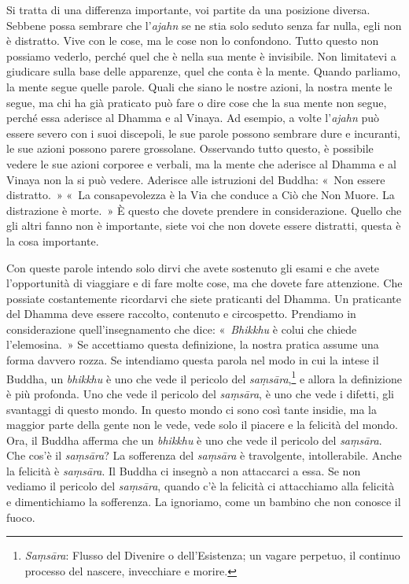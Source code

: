Si tratta di una differenza importante, voi partite da una posizione
diversa. Sebbene possa sembrare che l'\emph{ajahn} se ne stia solo
seduto senza far nulla, egli non è distratto. Vive con le cose, ma le
cose non lo confondono. Tutto questo non possiamo vederlo, perché quel
che è nella sua mente è invisibile. Non limitatevi a giudicare sulla
base delle apparenze, quel che conta è la mente. Quando parliamo, la
mente segue quelle parole. Quali che siano le nostre azioni, la nostra
mente le segue, ma chi ha già praticato può fare o dire cose che la sua
mente non segue, perché essa aderisce al Dhamma e al Vinaya. Ad esempio,
a volte l'\emph{ajahn} può essere severo con i suoi discepoli, le sue
parole possono sembrare dure e incuranti, le sue azioni possono parere
grossolane. Osservando tutto questo, è possibile vedere le sue azioni
corporee e verbali, ma la mente che aderisce al Dhamma e al Vinaya non
la si può vedere. Aderisce alle istruzioni del Buddha: «~Non essere
distratto.~» «~La consapevolezza è la Via che conduce a Ciò che Non
Muore. La distrazione è morte.~» È questo che dovete prendere in
considerazione. Quello che gli altri fanno non è importante, siete voi
che non dovete essere distratti, questa è la cosa importante.

Con queste parole intendo solo dirvi che avete sostenuto gli esami e che
avete l'opportunità di viaggiare e di fare molte cose, ma che dovete
fare attenzione. Che possiate costantemente ricordarvi che siete
praticanti del Dhamma. Un praticante del Dhamma deve essere raccolto,
contenuto e circospetto. Prendiamo in considerazione quell'insegnamento
che dice: «~\emph{Bhikkhu} è colui che chiede l'elemosina.~» Se
accettiamo questa definizione, la nostra pratica assume una forma
davvero rozza. Se intendiamo questa parola nel modo in cui la intese il
Buddha, un \emph{bhikkhu} è uno che vede il pericolo del
\emph{saṃsāra},\footnote{\emph{Saṃsāra}: Flusso del Divenire o
  dell'Esistenza; un vagare perpetuo, il continuo processo del nascere,
  invecchiare e morire.} e allora la definizione è più profonda. Uno che
vede il pericolo del \emph{saṃsāra}, è uno che vede i difetti, gli
svantaggi di questo mondo. In questo mondo ci sono così tante insidie,
ma la maggior parte della gente non le vede, vede solo il piacere e la
felicità del mondo. Ora, il Buddha afferma che un \emph{bhikkhu} è uno
che vede il pericolo del \emph{saṃsāra}. Che cos'è il \emph{saṃsāra}? La
sofferenza del \emph{saṃsāra} è travolgente, intollerabile. Anche la
felicità è \emph{saṃsāra}. Il Buddha ci insegnò a non attaccarci a essa.
Se non vediamo il pericolo del \emph{saṃsāra}, quando c'è la felicità ci
attacchiamo alla felicità e dimentichiamo la sofferenza. La ignoriamo,
come un bambino che non conosce il fuoco.

